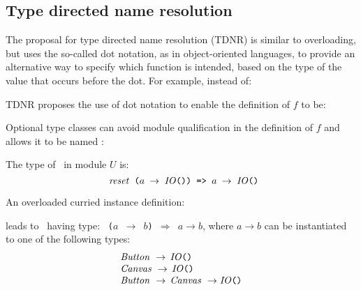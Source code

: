 \subsection{Type directed name resolution}
\label{sec:type-directed-name-resolution}

The proposal for type directed name resolution (TDNR)
\cite{TDNR-proposal} is similar to overloading, but uses the so-called
dot notation, as in object-oriented languages, to provide an
alternative way to specify which function is intended, based on the
type of the value that occurs before the dot. For example, instead of:


TDNR proposes the use of dot notation to enable the definition of $f$
to be: %


Optional type classes can avoid module qualification in the definition
of $f$ and allows it to be named \reset:
    

The type of \reset\ in module $U$ is:
\[ \texttt{ {\it reset\/}\ ($a$ $\rightarrow$ {\it IO\/}()) => $a$ $\rightarrow$ {\it IO\/}()} \]
  
An overloaded curried instance definition:

leads to \reset\ having type:
{\tt \reset\ ($a$ $\rightarrow$ $b$) $\Rightarrow$ $a \rightarrow b$}, where $a\rightarrow b$ can be
instantiated to one of the following types:
\[ \begin{array}{l}
  {\it Button\/}\ \rightarrow \,{\it IO\/}\texttt{()} \\
  {\it Canvas\/}\ \rightarrow \,{\it IO\/}\texttt{()}\\
  {\it Button\/}\ \rightarrow \,{\it Canvas\/}\ \rightarrow {\it IO\/}\texttt{()}
\end{array}
\]
  
